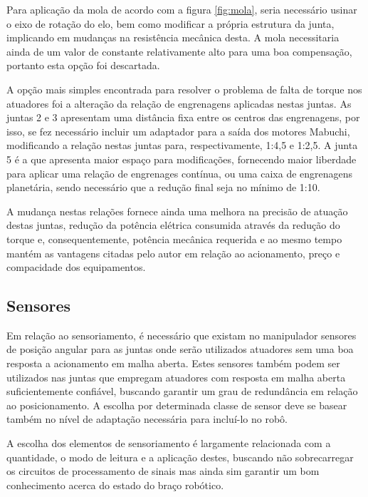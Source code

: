 Para aplicação da mola de acordo com a figura \ref{fig:mola}, seria necessário
usinar o eixo de rotação do elo, bem como modificar a própria estrutura da junta, 
implicando em mudanças na resistência mecânica desta. A mola necessitaria ainda
de um valor de constante relativamente alto para uma boa compensação, portanto 
esta opção foi descartada.

A opção mais simples encontrada para resolver o problema de falta de torque nos
atuadores foi a alteração da relação de engrenagens aplicadas 
nestas juntas. As juntas 2 e 3 apresentam uma distância fixa entre os centros das 
engrenagens, por isso, se fez necessário incluir um adaptador para a saída dos 
motores Mabuchi, modificando a relação nestas juntas para, respectivamente, 1:4,5 e 
1:2,5. A junta 5 é a que apresenta maior espaço para modificações, fornecendo maior 
liberdade para aplicar uma relação de engrenages contínua, ou uma caixa de engrenagens
planetária, sendo necessário que a redução final seja no mínimo de 1:10.

A mudança nestas relações fornece ainda uma melhora na precisão de atuação destas 
juntas, redução da potência elétrica consumida através da redução do torque e, 
consequentemente, potência mecânica requerida e ao mesmo tempo mantém as vantagens 
citadas pelo autor em relação ao acionamento, preço e compacidade dos equipamentos.

\subsection{Sensores}
Em relação ao sensoriamento, é necessário que existam no manipulador 
sensores de posição angular para as juntas onde serão utilizados 
atuadores sem uma boa resposta a acionamento em malha aberta. Estes sensores
também podem ser utilizados nas juntas que empregam atuadores com 
resposta em malha aberta suficientemente confiável, buscando garantir 
um grau de redundância em relação ao posicionamento. A escolha por determinada 
classe de sensor deve se basear também no nível de adaptação necessária para 
incluí-lo no robô. 

A escolha dos elementos de sensoriamento é largamente relacionada com a 
quantidade, o modo de leitura e a aplicação destes, buscando não sobrecarregar os circuitos 
de processamento de sinais mas ainda sim garantir um bom conhecimento 
acerca do estado do braço robótico. 

